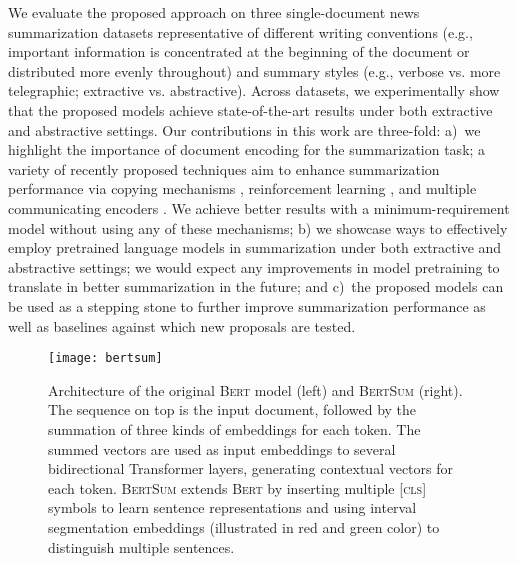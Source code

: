 \documentclass[11pt,a4paper]{article}
\begin{document}
    
    We evaluate the proposed approach on three single-document news
    summarization datasets representative of different writing
    conventions (e.g., important information is concentrated at the
    beginning of the document or distributed more evenly throughout)
    and summary styles (e.g., verbose vs. more telegraphic; extractive
    vs. abstractive). Across datasets, we experimentally show that the
    proposed models achieve state-of-the-art results under both
    extractive and abstractive settings. Our contributions in this
    work are three-fold: a)~we highlight the importance of document
    encoding for the summarization task; a variety of recently
    proposed techniques aim to enhance summarization performance via
    copying mechanisms \cite{gu-etal-2016-incorporating,see-acl17,nallapati2017summarunner},
    reinforcement learning \cite{narayan2018ranking,paulus2017deep,dong2018banditsum},
    and multiple communicating encoders \cite{celikyilmaz2018deep}. We
    achieve better results with a minimum-requirement model without
    using any of these mechanisms; b) we showcase ways to effectively
    employ pretrained language models in summarization under both
    extractive and abstractive settings; we would expect any
    improvements in model pretraining to translate in better
    summarization in the future; and c)~the proposed models can be
    used as a stepping stone to further improve summarization
    performance as well as baselines against which new proposals are
    tested.
    
    


    \begin{figure*}[t]
        \centering
        \texttt{[image: bertsum]}
        \label{trans}
        \caption{\label{fig:bert:architecture} Architecture of the
            original \textsc{Bert} model (left) and \textsc{BertSum}
            (right). The sequence on top is the input document, followed
            by the summation of three kinds of embeddings for each
            token. The summed vectors are used as input embeddings to
            several bidirectional Transformer layers, generating
            contextual vectors for each token. \textsc{BertSum} extends
            \textsc{Bert} by inserting multiple [\textsc{cls}] symbols
            to learn sentence representations and using interval
            segmentation embeddings (illustrated in red and green color)
            to distinguish multiple sentences.}
    \end{figure*}
    
\end{document}
